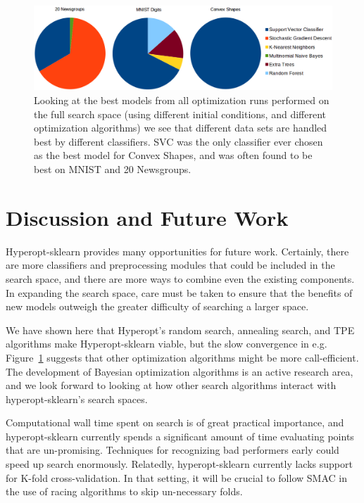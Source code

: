 \documentclass[wcp]{jmlr}
\begin{document}
\begin{figure}
    \centering
    \caption{
    }
    \label{fig:errtpe}
\end{figure}

\begin{figure}
    \centering
    \includegraphics[width=\textwidth]{graphics/pie}
    \caption{Looking at the best models from all optimization runs performed on the full search space (using different initial conditions, and different optimization algorithms)
             we see that different data sets are handled best by different classifiers.
             SVC was the only classifier ever chosen as the best model for Convex Shapes, and was often found to be best on MNIST and 20 Newsgroups.
         }
    \label{fig:npie}
\end{figure}



\section{Discussion and Future Work}
Hyperopt-sklearn provides many opportunities for future work.
Certainly, there are more classifiers and preprocessing modules that could be included in the search space,
and there are more ways to combine even the existing components.
In expanding the search space, care must be taken to ensure that the benefits of new models outweigh the greater difficulty of searching a larger space.

We have shown here that Hyperopt's random search, annealing search, and TPE algorithms make Hyperopt-sklearn viable, but the slow convergence in e.g. Figure~\ref{fig:errtpe} suggests
that other optimization algorithms might be more call-efficient.
The development of Bayesian optimization algorithms is an active research area, and  we look forward to looking at how other search algorithms interact with hyperopt-sklearn's search spaces.

Computational wall time spent on search is of great practical importance, and hyperopt-sklearn currently spends a significant amount of time evaluating points that are un-promising.
Techniques for recognizing bad performers early could speed up search enormously.
Relatedly, hyperopt-sklearn currently lacks support for K-fold cross-validation. In that setting, it will be crucial to follow SMAC in the use of racing algorithms to skip un-necessary folds.
\end{document}
